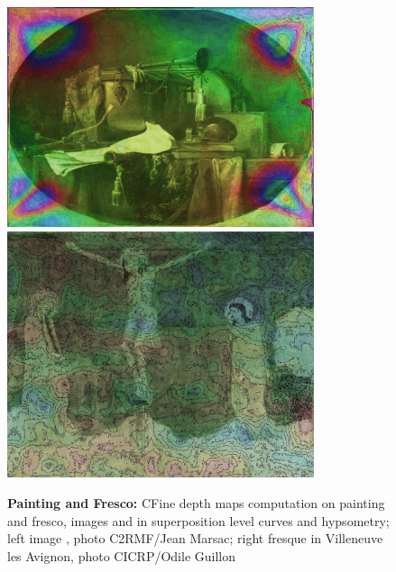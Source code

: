 \begin{figure}
\includegraphics[width=90mm]{FIGS/SAMPLES/Louvre-Superp.jpg}
\includegraphics[width=90mm]{FIGS/SAMPLES/FresqVilAv.jpg}
\caption{{\bf Painting and Fresco: } CFine depth maps computation on painting and fresco,
images and in superposition level curves and hypsometry;
left image  , photo C2RMF/Jean Marsac; right fresque in Villeneuve
les Avignon, photo CICRP/Odile Guillon}
\end{figure}



